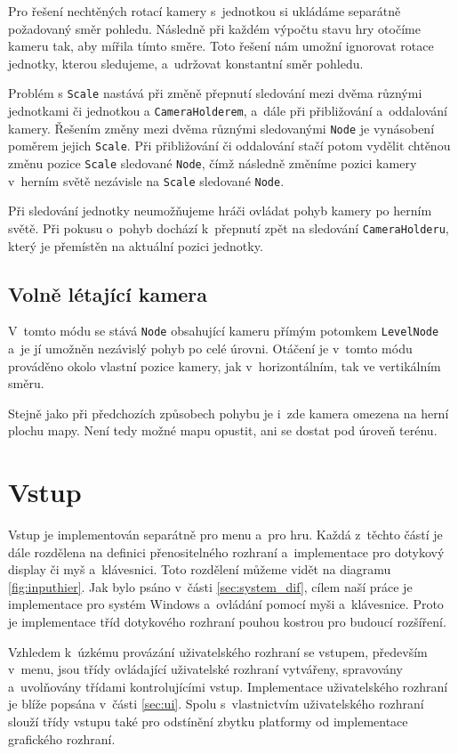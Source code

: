 Pro řešení nechtěných rotací kamery s~jednotkou si ukládáme separátně požadovaný směr pohledu. Následně při každém výpočtu stavu hry otočíme kameru tak, aby mířila tímto směre. Toto řešení nám umožní ignorovat rotace jednotky, kterou sledujeme, a~udržovat konstantní směr pohledu. 

Problém s \texttt{Scale} nastává při změně přepnutí sledování mezi dvěma různými jednotkami či jednotkou a \texttt{CameraHolderem}, a~dále při přibližování a~oddalování kamery. Řešením změny mezi dvěma různými sledovanými \texttt{Node} je vynásobení poměrem jejich \texttt{Scale}. Při přibližování či oddalování stačí potom vydělit chtěnou změnu pozice \texttt{Scale} sledované \texttt{Node}, čímž následně změníme pozici kamery v~herním světě nezávisle na \texttt{Scale} sledované \texttt{Node}.

Při sledování jednotky neumožňujeme hráči ovládat pohyb kamery po herním světě. Při pokusu o~pohyb dochází k~přepnutí zpět na sledování \texttt{CameraHolderu}, který je přemístěn na aktuální pozici jednotky.

\subsection{Volně létající kamera}
V~tomto módu se stává \texttt{Node} obsahující kameru přímým potomkem \texttt{LevelNode} a~je jí umožněn nezávislý pohyb po celé úrovni. Otáčení je v~tomto módu prováděno okolo vlastní pozice kamery, jak v~horizontálním, tak ve vertikálním směru. 

Stejně jako při předchozích způsobech pohybu je i~zde kamera omezena na herní plochu mapy. Není tedy možné mapu opustit, ani se dostat pod úroveň terénu.

\section{Vstup}
\label{sec:input}
Vstup je implementován separátně pro menu a~pro hru. Každá z~těchto částí je dále rozdělena na definici přenositelného rozhraní a~implementace pro dotykový display či myš a~klávesnici. Toto rozdělení můžeme vidět na diagramu \ref{fig:inputhier}. Jak bylo psáno v~části \ref{sec:system_dif}, cílem naší práce je implementace pro systém Windows a~ovládání pomocí myši a~klávesnice. Proto je implementace tříd dotykového rozhraní pouhou kostrou pro budoucí rozšíření. 

Vzhledem k~úzkému provázání uživatelského rozhraní se vstupem, především v~menu, jsou třídy ovládající uživatelské rozhraní vytvářeny, spravovány a~uvolňovány třídami kontrolujícími vstup. Implementace uživatelského rozhraní je blíže popsána v~části \ref{sec:ui}. Spolu s~vlastnictvím uživatelského rozhraní slouží třídy vstupu také pro odstínění zbytku platformy od implementace grafického rozhraní. 

